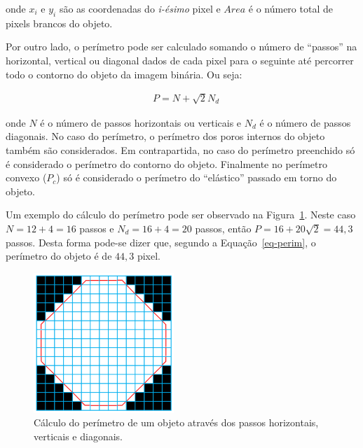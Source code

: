 onde $x_i$ e $y_i$ são as coordenadas do \textit{i-ésimo} pixel e
$Area$ é o número total de pixels brancos do objeto.

Por outro lado, o perímetro pode ser calculado somando o número de
``passos'' na horizontal, vertical ou diagonal dados de cada pixel
para o seguinte até percorrer todo o contorno do objeto da imagem
binária. Ou seja:

\begin{align}
 &P=N+\sqrt{2}N_{d}\label{eq-perim}
\end{align}

onde $N$ é o número de passos horizontais ou verticais e $N_{d}$ é o
número de passos diagonais. No caso do perímetro, o perímetro dos
poros internos do objeto também são considerados. Em contrapartida, no
caso do perímetro preenchido só é considerado o perímetro do contorno
do objeto. Finalmente no perímetro convexo ($P_c$) só é considerado o
perímetro do ``elástico'' passado em torno do objeto.

Um exemplo do cálculo do perímetro pode ser observado na
Figura~\ref{fig:eq-perim}. Neste caso $N=12+4=16$ passos e
$N_{d}=16+4=20$ passos, então $P=16+20\sqrt{2}=44,3$ passos. Desta
forma pode-se dizer que, segundo a Equação~\eqref{eq-perim}, o
perímetro do objeto é de $44,3$ pixel.

\begin{figure} [h]
  \begin{center}
    \includegraphics[height=150pt,width=150pt]{images/fig_eq-perim}
    \caption{Cálculo do perímetro de um objeto através dos passos
      horizontais, verticais e diagonais.}\label{fig:eq-perim}
  \end{center}
\end{figure}



